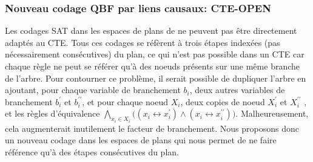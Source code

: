 %
%
\subsubsection{Nouveau codage QBF par liens causaux: CTE-OPEN}






Les codages SAT dans les espaces de plans de \cite{MK99} ne peuvent pas être directement adaptés au CTE. Tous ces codages se réfèrent à trois étapes indexées (pas nécessairement consécutives) du plan, ce qui n'est pas possible dans un CTE car chaque règle ne peut se référer qu'à des noeuds présents sur une même branche de l'arbre. Pour contourner ce problème, il serait possible de dupliquer l'arbre en ajoutant, pour chaque variable de branchement $b_{i}$, deux autres variables de branchement $b^{\prime}_{i}$ et $b^{\prime\prime}_{i}$, et pour chaque noeud $X_{i}$, deux copies de noeud $X^{\prime}_{i}$ et $X^{\prime\prime}_{i}$ , et les règles d'équivalence $\bigwedge_{x_{i}\in X_{i}} \big((x_{i}\leftrightarrow x^{\prime}_{i})\wedge (x_{i}\leftrightarrow x^{\prime\prime}_{i})\big)$. Malheureusement, cela augmenterait inutilement le facteur de branchement. Nous proposons donc un nouveau codage dans les espaces de plans qui nous permet de ne faire référence qu'à des étapes consécutives du plan.

